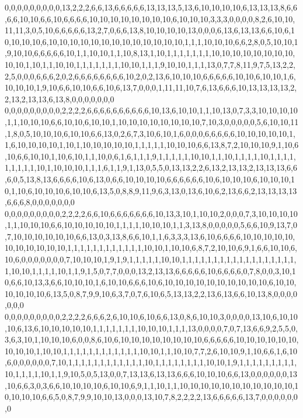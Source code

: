 0,0,0,0,0,0,0,0,0,13,2,2,2,6,6,13,6,6,6,6,6,13,13,13,5,13,6,10,10,10,10,6,13,13,13,8,6,6,6,6,10,10,6,6,10,6,6,6,6,10,10,10,10,10,10,10,10,6,10,10,10,3,3,3,0,0,0,0,8,2,6,10,10,11,11,3,0,5,10,6,6,6,6,6,13,2,7,0,6,6,13,8,10,10,10,10,13,0,0,0,6,13,6,13,13,6,6,10,6,10,10,10,10,6,10,10,10,10,10,10,10,10,10,10,10,10,10,1,1,1,10,10,10,6,6,2,8,0,5,10,10,1,9,10,10,6,6,6,6,6,10,1,1,10,10,1,1,10,8,13,1,10,1,1,1,1,1,1,1,10,10,10,10,10,10,10,10,10,10,1,10,1,1,10,10,1,1,1,1,1,1,1,10,10,1,1,1,9,10,10,1,1,1,13,0,7,7,8,11,9,7,5,13,2,2,2,5,0,0,0,6,6,6,2,0,2,6,6,6,6,6,6,6,6,10,2,0,2,13,6,10,10,10,6,6,6,6,6,10,10,6,10,10,1,6,10,10,10,1,9,10,6,6,10,10,6,6,10,6,13,7,0,0,0,1,11,11,10,7,6,13,6,6,6,10,13,13,13,13,2,2,13,2,13,13,6,13,8,0,0,0,0,0,0,0
0,0,0,0,0,0,0,0,0,2,2,2,2,6,6,6,6,6,6,6,6,6,6,10,13,6,10,10,1,1,10,13,0,7,3,3,10,10,10,10,1,1,10,10,10,6,6,10,10,6,10,10,1,10,10,10,10,10,10,10,10,7,10,3,0,0,0,0,0,5,6,10,10,11,1,8,0,5,10,10,10,6,10,10,6,6,13,0,2,6,7,3,10,6,10,1,6,0,0,0,6,6,6,6,6,10,10,10,10,10,1,1,6,10,10,10,10,1,10,1,10,10,10,10,10,1,1,1,1,1,10,10,10,6,6,13,8,7,2,10,10,10,9,1,10,6,10,6,6,10,10,1,10,6,10,1,1,10,0,6,1,6,1,1,1,9,1,1,1,1,1,10,10,1,1,10,1,1,1,1,10,1,1,1,1,1,1,1,1,1,10,1,10,10,10,1,1,1,6,1,1,9,1,13,0,5,5,0,13,13,2,2,6,13,2,13,13,2,13,13,13,6,6,6,0,5,13,8,13,6,6,6,6,10,6,13,0,6,6,10,10,10,10,6,6,6,6,6,6,10,6,10,10,10,6,10,10,10,10,1,10,6,10,10,10,6,10,10,6,13,5,0,8,8,9,11,9,6,3,13,0,13,6,10,6,2,13,6,6,2,13,13,13,13,6,6,6,8,0,0,0,0,0,0,0
0,0,0,0,0,0,0,0,0,2,2,2,2,6,6,10,6,6,6,6,6,6,6,10,13,3,10,1,10,10,2,0,0,0,7,3,10,10,10,10,1,1,10,10,10,6,6,10,10,10,10,10,1,1,1,1,10,10,10,1,1,3,13,8,0,0,0,0,0,5,6,6,10,9,13,7,0,7,10,10,10,10,10,10,6,6,13,0,3,13,8,6,6,10,1,1,6,3,3,3,13,6,10,6,6,6,6,10,10,10,10,10,10,10,10,10,10,10,1,1,1,1,1,1,1,1,1,1,1,1,10,10,1,10,10,6,8,7,2,10,10,6,9,1,6,6,10,10,6,10,6,0,0,0,0,0,0,0,7,10,10,10,1,9,1,9,1,1,1,1,1,10,10,1,1,1,1,1,1,1,1,1,1,1,1,1,1,1,1,1,1,1,10,10,1,1,1,1,10,1,1,9,1,5,0,7,7,0,0,0,13,2,13,13,6,6,6,6,6,10,6,6,6,6,0,7,8,0,0,3,10,10,6,6,10,13,3,6,6,10,10,10,1,6,10,10,6,6,6,10,6,10,10,10,10,10,10,10,10,10,10,6,10,10,10,10,10,10,6,13,5,0,8,7,9,9,10,6,3,7,0,7,6,10,6,5,13,13,2,2,13,6,13,6,6,10,13,8,0,0,0,0,0,0,0
0,0,0,0,0,0,0,0,0,2,2,2,2,6,6,6,2,6,10,10,6,10,6,6,13,0,8,6,10,10,3,0,0,0,0,13,10,6,10,10,10,6,13,6,10,10,10,10,10,1,1,1,1,1,1,1,10,10,10,1,1,1,13,0,0,0,0,7,0,7,13,6,6,9,2,5,5,0,3,6,3,10,1,10,10,10,6,0,0,8,6,10,6,10,10,10,10,10,10,10,10,6,6,6,6,6,10,10,10,10,10,10,10,10,10,1,10,10,1,1,1,1,1,1,1,1,1,1,1,1,10,10,1,1,10,10,7,7,2,6,10,10,9,1,10,6,6,1,6,10,6,0,0,0,0,0,0,7,10,1,1,1,1,1,1,1,1,1,1,1,1,10,1,1,1,1,1,1,1,1,10,10,1,9,1,1,1,1,1,1,1,1,1,10,1,1,1,1,10,1,1,9,10,5,0,5,13,0,0,7,13,13,6,13,13,6,6,6,10,10,10,6,6,13,0,0,0,0,0,0,13,10,6,6,3,0,3,6,6,10,10,10,10,6,10,10,6,9,1,1,10,1,1,10,10,10,10,10,10,10,10,10,10,10,10,10,10,10,6,6,5,0,8,7,9,9,10,10,13,0,0,0,13,10,7,8,2,2,2,2,13,6,6,6,6,6,13,7,0,0,0,0,0,0,0
